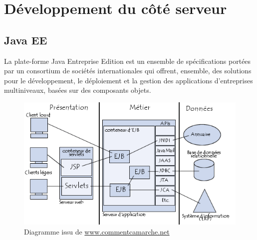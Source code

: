 \section{Développement du côté serveur}

\subsection{Java EE}

La plate-forme Java Entreprise Edition est un ensemble de spécifications portées par un consortium de sociétés internationales qui offrent, ensemble, des solutions pour le développement, le déploiement et la gestion des applications d'entreprises multiniveaux, basées sur des composants objets.

\begin{figure}[!h]
    \center
   	\includegraphics[scale=0.65]{architecture_JEE.png}
   	\caption{Diagramme issu de \url{www.commentcamarche.net}}
    \label{reference1}
\end{figure}
\bigskip

